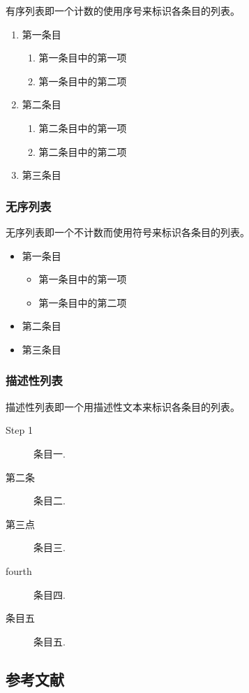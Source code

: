 有序列表即一个计数的使用序号来标识各条目的列表。
  \begin{enumerate}
      \item 第一条目
          \begin{enumerate}
              \item 第一条目中的第一项
              \item 第一条目中的第二项
          \end{enumerate}
      \item 第二条目
    \begin{enumerate}
      \item 第二条目中的第一项
      \item 第二条目中的第二项
    \end{enumerate}
      \item 第三条目
  \end{enumerate}

\subsubsection{无序列表}
  无序列表即一个不计数而使用符号来标识各条目的列表。
  \begin{itemize}
      \item 第一条目
      \begin{itemize}
          \item 第一条目中的第一项
          \item 第一条目中的第二项
      \end{itemize}
      \item 第二条目
      \item 第三条目
  \end{itemize}

\subsubsection{描述性列表}

描述性列表即一个用描述性文本来标识各条目的列表。

\begin{description}
  \item[Step 1]  条目一.
  \item[第二条]  条目二.
  \item[第三点]  条目三.
  \item[fourth]  条目四.
  \item[条目五]  条目五.
\end{description}

\subsection{参考文献}

